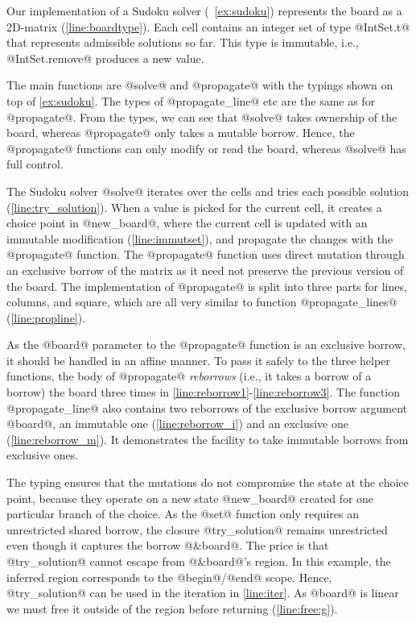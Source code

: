 Our implementation of a Sudoku solver (~\cref{ex:sudoku}) represents
the board as a 2D-matrix (\cref{line:boardtype}).
Each cell contains an integer set of type @IntSet.t@ that represents
admissible solutions so far. This type is immutable, i.e.,
@IntSet.remove@ produces a new value.

The main functions are @solve@ and @propagate@ with the typings shown
on top of \cref{ex:sudoku}. The types of @propagate_line@ etc are the
same as for @propagate@. From the types, we can see that @solve@ takes
ownership of the board, whereas @propagate@ only takes a mutable
borrow. Hence, the @propagate@ functions can only modify or read the board,
whereas @solve@ has full control. 

The Sudoku solver @solve@ iterates over the cells and tries each possible
solution (\cref{line:try_solution}). 
When a value is picked for the current cell, it creates a choice point
in @new_board@, where the current cell is updated with an immutable modification (\cref{line:immutset}), and propagate
the changes with the @propagate@ function.
The @propagate@ function uses direct mutation through an
exclusive borrow of the matrix as it need not preserve the previous
version of the board.
The implementation of @propagate@ is split into three parts
for lines, columns, and square, which are all very similar to function
@propagate_lines@ (\cref{line:propline}).

As the @board@ parameter to the @propagate@ function is an exclusive
borrow, it should be handled 
in an affine manner. To pass it safely to the three helper functions,
the body of @propagate@ \emph{reborrows} (i.e., it takes a borrow of a
borrow) the board three times in 
\cref{line:reborrow1}-\cref{line:reborrow3}.
The function @propagate_line@ also contains two reborrows of the
exclusive borrow argument @board@, an
immutable one (\cref{line:reborrow_i}) and an exclusive one
(\cref{line:reborrow_m}). It demonstrates the facility 
to take immutable borrows from exclusive ones.

The typing ensures that the mutations do not compromise the state at
the choice point, because they operate on a new state @new_board@ created for one
particular branch of the choice.
As the @set@ function only requires an unrestricted shared borrow,
the closure @try_solution@ remains unrestricted even though
it captures the borrow @&board@.
The price is that @try_solution@ cannot escape from
@&board@'s region. In this example, the inferred region corresponds to the
@begin@/@end@ scope. 
Hence, @try_solution@ can be used in
the iteration in \cref{line:iter}.
As @board@ is linear we must free it outside of the region
before returning (\cref{line:free:g}).


